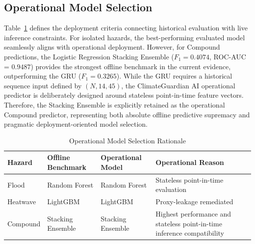 \subsection{Operational Model Selection}
Table~\ref{tab:op_selection} defines the deployment criteria connecting historical evaluation with live inference constraints. For isolated hazards, the best-performing evaluated model seamlessly aligns with operational deployment. However, for Compound predictions, the Logistic Regression Stacking Ensemble ($F_1 = 0.4074$, ROC-AUC = $0.9487$) provides the strongest offline benchmark in the current evidence, outperforming the GRU ($F_1 = 0.3265$). While the GRU requires a historical sequence input defined by $(N, 14, 45)$, the ClimateGuardian AI operational predictor is deliberately designed around stateless point-in-time feature vectors. Therefore, the Stacking Ensemble is explicitly retained as the operational Compound predictor, representing both absolute offline predictive supremacy and pragmatic deployment-oriented model selection.

\begin{table}[htbp]
\caption{Operational Model Selection Rationale}
\begin{center}
\begin{tabular}{p{1.3cm} p{2.2cm} p{1.6cm} p{2.4cm}}
\toprule
\textbf{Hazard} & \textbf{Offline Benchmark} & \textbf{Operational Model} & \textbf{Operational Reason} \\
\midrule
Flood & Random Forest & Random Forest & Stateless point-in-time evaluation \\
Heatwave & LightGBM & LightGBM & Proxy-leakage remediated \\
Compound & Stacking Ensemble & Stacking Ensemble & Highest performance and stateless point-in-time inference compatibility \\
\bottomrule
\end{tabular}
\label{tab:op_selection}
\end{center}
\end{table}

